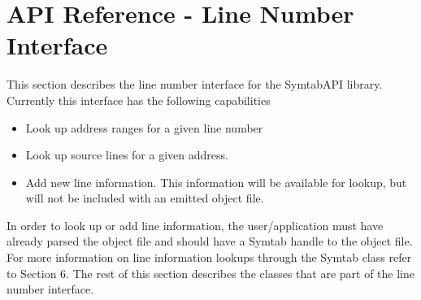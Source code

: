 \section{API Reference - Line Number Interface}\label{LineNoInterface}

This section describes the line number interface for the SymtabAPI library. Currently this interface has the following capabilities
\begin{itemize}
    \item Look up address ranges for a given line number
    \item Look up source lines for a given address.
    \item Add new line information. This information will be available for lookup, but will not be included with an emitted object file. 
\end{itemize}

In order to look up or add line information, the user/application must have already parsed the object file and should have a Symtab handle to the object file. For more information on line information lookups through the Symtab class refer to Section 6. The rest of this section describes the classes that are part of the line number interface.




